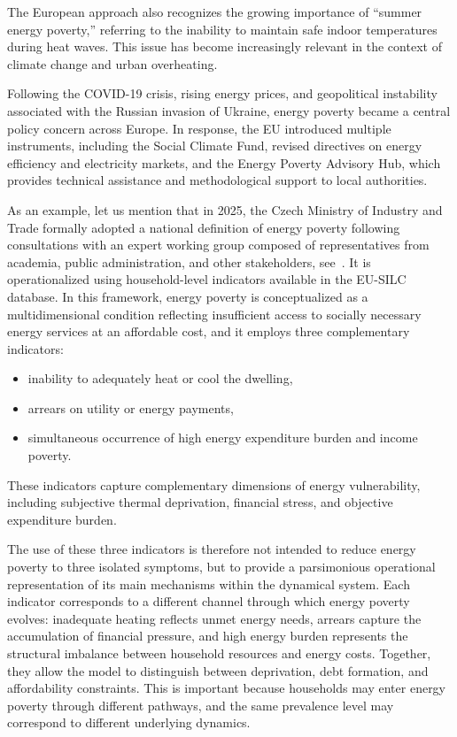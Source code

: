 \documentclass[11pt,a4paper]{article}
\begin{document}
The European approach also recognizes the growing importance of ``summer energy poverty,'' referring to the inability to maintain safe indoor temperatures during heat waves. This issue has become increasingly relevant in the context of climate change and urban overheating.

Following the COVID-19 crisis, rising energy prices, and geopolitical instability associated with the Russian invasion of Ukraine, energy poverty became a central policy concern across Europe. In response, the EU introduced multiple instruments, including the Social Climate Fund, revised directives on energy efficiency and electricity markets, and the Energy Poverty Advisory Hub, which provides technical assistance and methodological support to local authorities.

As an example, let us mention that in 2025, the Czech Ministry of Industry and Trade formally adopted a national definition of energy poverty following consultations with an expert working group composed of representatives from academia, public administration, and other stakeholders, see~\cite{mpo2025_definition,klusacek_kalenda2024_energypoverty}. It is operationalized using household-level indicators available in the EU-SILC database. In this framework, energy poverty is conceptualized as a multidimensional condition reflecting insufficient access to socially necessary energy services at an affordable cost, and it employs three complementary indicators:
\begin{itemize}
    \item[\textbf{I1:}] inability to adequately heat or cool the dwelling,
    \item[\textbf{I2:}] arrears on utility or energy payments,
    \item[\textbf{I3:}] simultaneous occurrence of high energy expenditure burden and income poverty.
\end{itemize}
These indicators capture complementary dimensions of energy vulnerability, including subjective thermal deprivation, financial stress, and objective expenditure burden.

The use of these three indicators is therefore not intended to reduce energy poverty to three isolated symptoms, but to provide a parsimonious operational representation of its main mechanisms within the dynamical system. Each indicator corresponds to a different channel through which energy poverty evolves: inadequate heating reflects unmet energy needs, arrears capture the accumulation of financial pressure, and high energy burden represents the structural imbalance between household resources and energy costs. Together, they allow the model to distinguish between deprivation, debt formation, and affordability constraints. This is important because households may enter energy poverty through different pathways, and the same prevalence level may correspond to different underlying dynamics. 
\end{document}
